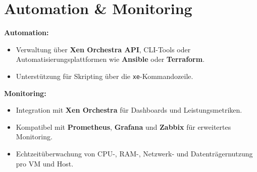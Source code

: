 \documentclass[BMR,Seminar,ngerman,IEEE]{twbook}
\begin{document}
\section{Automation \& Monitoring}
\textbf{Automation:}
\begin{itemize}[noitemsep]
  \item Verwaltung über \textbf{Xen Orchestra API}, CLI-Tools oder Automatisierungsplattformen wie \textbf{Ansible} oder \textbf{Terraform}.
  \item Unterstützung für Skripting über die \texttt{xe}-Kommandozeile.
\end{itemize}

\textbf{Monitoring:}
\begin{itemize}[noitemsep]
  \item Integration mit \textbf{Xen Orchestra} für Dashboards und Leistungsmetriken.
  \item Kompatibel mit \textbf{Prometheus}, \textbf{Grafana} und \textbf{Zabbix} für erweitertes Monitoring.
  \item Echtzeitüberwachung von CPU-, RAM-, Netzwerk- und Datenträgernutzung pro VM und Host.
\end{itemize}
\end{document}
